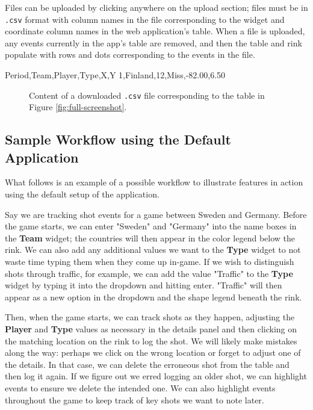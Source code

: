 \documentclass[letterpaper]{article}
\begin{document}
Files can be uploaded by clicking anywhere on the upload section; files must be in \texttt{.csv} format with column names in the file corresponding to the widget and coordinate column names in the web application's table. When a file is uploaded, any events currently in the app's table are removed, and then the table and rink populate with rows and dots corresponding to the events in the file.

\begin{verbbox}
	Period,Team,Player,Type,X,Y
	1,Finland,12,Miss,-82.00,6.50
\end{verbbox}
\begin{figure}[ht]
	\centering
	\theverbbox
	\caption{Content of a downloaded \texttt{.csv} file corresponding to the table in Figure \ref{fig:full-screenshot}.}
	\label{fig:csvoutput}
\end{figure}
\subsection{Sample Workflow using the Default Application}
What follows is an example of a possible workflow to illustrate features in action using the default setup of the application.

Say we are tracking shot events for a game between Sweden and Germany. Before the game starts, we can enter "Sweden" and "Germany" into the name boxes in the \textbf{Team} widget; the countries will then appear in the color legend below the rink. We can also add any additional values we want to the \textbf{Type} widget to not waste time typing them when they come up in-game. If we wish to distinguish shots through traffic, for example, we can add the value "Traffic" to the \textbf{Type} widget by typing it into the dropdown and hitting enter. "Traffic" will then appear as a new option in the dropdown and the shape legend beneath the rink.

Then, when the game starts, we can track shots as they happen, adjusting the \textbf{Player} and \textbf{Type} values as necessary in the details panel and then clicking on the matching location on the rink to log the shot. We will likely make mistakes along the way: perhaps we click on the wrong location or forget to adjust one of the details. In that case, we can delete the erroneous shot from the table and then log it again. If we figure out we erred logging an older shot, we can highlight events to ensure we delete the intended one. We can also highlight events throughout the game to keep track of key shots we want to note later.
\end{document}

